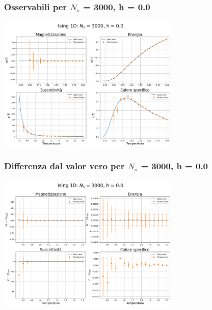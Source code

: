 \begin{frame}
    \frametitle{Osservabili per $N_s$ = 3000, h = 0.0}
    \framesubtitle{}

    \centering
    \includegraphics[width=0.65\textwidth]{Immagini/backupIsing1D/obs_3000_0.0.png}

\end{frame}



\begin{frame}
    \frametitle{Differenza dal valor vero per $N_s$ = 3000, h = 0.0}
    \framesubtitle{}

    \centering
    \includegraphics[width=0.65\textwidth]{Immagini/backupIsing1D/obs_3000_0.0_diff.png}

\end{frame}



